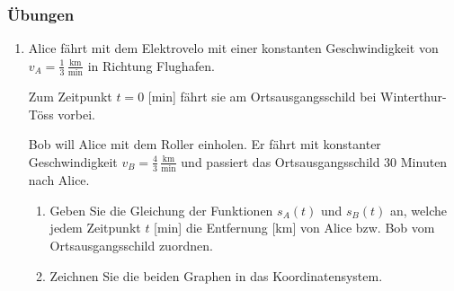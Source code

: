 \subsubsection{Übungen}
\begin{enumerate}
    \item Alice fährt mit dem Elektrovelo mit einer konstanten Geschwindigkeit von $v_{A} = \frac{1}{3}\,\frac{\text{km}}{\text{min}}$ in Richtung Flughafen.

          Zum Zeitpunkt $t = 0$ [min] fährt sie am Ortsausgangsschild bei Winterthur-Töss vorbei.

          Bob will Alice mit dem Roller einholen. Er fährt mit konstanter Geschwindigkeit $v_{B} = \frac{4}{3}\,\frac{\text{km}}{\text{min}}$ und passiert das Ortsausgangsschild 30 Minuten nach Alice.
          \begin{enumerate}
              \item Geben Sie die Gleichung der Funktionen $s_{A}(t)$ und $s_{B}(t)$ an, welche jedem Zeitpunkt $t$ [min] die Entfernung [km] von Alice bzw. Bob vom Ortsausgangsschild zuordnen.
              \item Zeichnen Sie die beiden Graphen in das Koordinatensystem.


\end{enumerate}
\end{enumerate}
